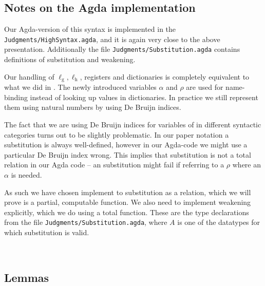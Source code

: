 \subsection{Notes on the Agda implementation}

Our Agda-version of this syntax is implemented in the
\texttt{Judgments/HighSyntax.agda}, and it is again very close to the above
presentation. Additionally the file \texttt{Judgments/Substitution.agda}
contains definitions of substitution and weakening.

Our handling of $\ell_{\mathrm{g}}, \ell_{\mathrm{h}}$, registers and
dictionaries is completely equivalent to what we did in \ATALe. The newly
introduced variables $\alpha$ and $\rho$ are used for name-binding instead of
looking up values in dictionaries. In practice we still represent them using
natural numbers by using De Bruijn indices.

The fact that we are using De Bruijn indices for variables of in different
syntactic categories turns out to be slightly problematic. In our paper notation
a substitution is always well-defined, however in our Agda-code we might use a
particular De Bruijn index wrong. This implies that substitution is not a total
relation in our Agda code -- an substitution might fail if referring to a $\rho$
where an $\alpha$ is needed.

As such we have chosen implement to substitution as a relation, which we will
prove is a partial, computable function. We also need to implement weakening
explicitly, which we do using a total function. These are the type declarations
from the file \texttt{Judgments/Substitution.agda}, where $A$ is one of the
datatypes for which substitution is valid.

\begin{code}
\>[2]\<[4]%
\>[4] \AgdaSymbol{:}       \<%
\\
\>[2]\<[4]%
\>[4] \AgdaSymbol{:}         \<%
\end{code}

\subsection{Lemmas}

